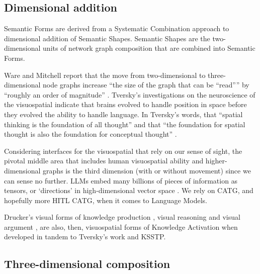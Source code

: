 \subsection{Dimensional addition}

Semantic Forms are derived from a Systematic Combination approach to dimensional addition of Semantic Shapes. Semantic Shapes are the two-dimensional units of network graph composition that are combined into Semantic Forms. 

Ware and Mitchell report that the move from two-dimensional to three-dimensional node graphs increase “the size of the graph that can be “read”” by “roughly an order of magnitude” \citep[p. 10]{ware_visualizing_2008}. Tversky’s investigations on the neuroscience of the visuospatial indicate that brains evolved to handle position in space before they evolved the ability to handle language. In Tversky’s words, that “spatial thinking is the foundation of all thought” and that “the foundation for spatial thought is also the foundation for conceptual thought” \citep{tversky_barbara_2022}.

Considering interfaces for the visuospatial that rely on our sense of sight, the pivotal middle area that includes human visuospatial ability and higher-dimensional graphs is the third dimension (with or without movement) since we can sense no further. LLMs embed many billions of pieces of information \citep[p. 1]{brown_language_2020} as tensors, or ‘directions’ in high-dimensional vector space \citep{sanderson_attention_2024}. We rely on CATG, and hopefully more HITL CATG, when it comes to Language Models. 

Drucker’s visual forms of knowledge production \citep{drucker_graphesis_2014}, visual reasoning and visual argument  \citep{tversky_barbara_2022}, are also, then, visuospatial forms of Knowledge Activation when developed in tandem to Tversky’s work and KSSTP. 

\subsection{Three-dimensional composition}

